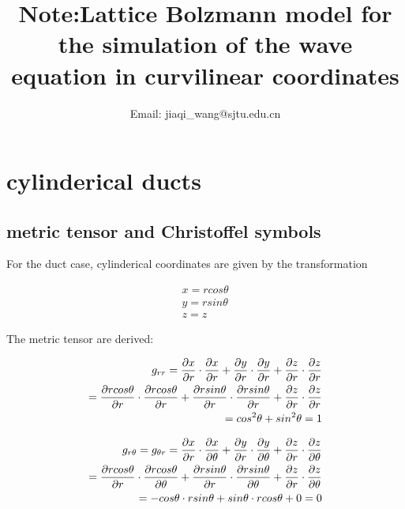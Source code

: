 \documentclass{Note}
\begin{document}
\title{Note:Lattice Bolzmann model for the simulation of the wave equation in curvilinear coordinates} 
\author{
     Email: jiaqi\_wang@sjtu.edu.cn
    } 

\maketitle

\section{cylinderical ducts}
\subsection{metric tensor and Christoffel symbols}
	For the duct case, cylinderical coordinates are given by the transformation


\begin{equation}
\begin{aligned}
x=rcos\theta\\
y=rsin\theta\\
z=z
\end{aligned}
\end{equation}

The metric tensor are derived:

\begin{equation}
\begin{aligned}
g_{rr}={\partial x\over \partial r}\cdot {\partial x\over \partial r}+{\partial y\over \partial r}\cdot {\partial y\over \partial r}+{\partial z\over \partial r}\cdot {\partial z\over \partial r}\\
={\partial rcos\theta\over \partial r}\cdot {\partial rcos\theta\over \partial r}+{\partial r sin\theta\over \partial r}\cdot {\partial r sin\theta\over \partial r}+{\partial z\over \partial r}\cdot {\partial z\over \partial r}\\
=cos^2\theta+sin^2\theta=1
\end{aligned}
\end{equation}

\begin{equation}
\begin{aligned}
g_{r\theta}=g_{\theta r}={\partial x\over \partial r}\cdot {\partial x\over \partial \theta}+{\partial y\over \partial r}\cdot {\partial y\over \partial \theta}+{\partial z\over \partial r}\cdot {\partial z\over \partial \theta}\\
={\partial rcos\theta\over \partial r}\cdot {\partial rcos\theta\over \partial \theta}+{\partial r sin\theta\over \partial r}\cdot {\partial r sin\theta\over \partial \theta}+{\partial z\over \partial r}\cdot {\partial z\over \partial \theta}\\
=-cos\theta\cdot r sin\theta+sin\theta\cdot r cos\theta +0=0
\end{aligned}
\end{equation}
\end{document}
